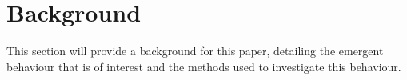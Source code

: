 \documentclass{article}
\begin{document}















\section{Background}
This section will provide a background for this paper, detailing the emergent behaviour that is of interest and the methods used to investigate this behaviour.  
\end{document}
